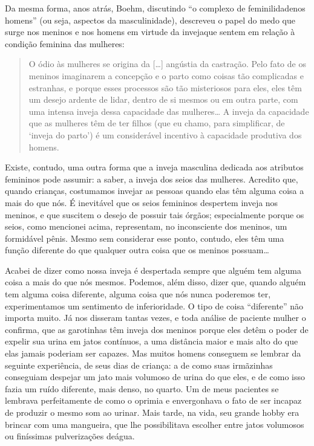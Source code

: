 Da mesma forma, anos atrás, Boehm,\idxboehm{} discutindo ``o
complexo de feminilidade\idxcompl[|(] nos homens'' (ou seja, aspectos
da masculinidade), descreveu o papel do medo que surge nos meninos e
nos homens em virtude da inveja\idxfemininve[|(] que sentem em relação à condição
feminina das mulheres:

\begin{quote}
O ódio às mulheres se origina da [\ldots{}] angústia da
castração.\idxcasta{} Pelo fato de os meninos imaginarem a concepção e o parto
como coisas tão complicadas e estranhas, e porque esses processos são
tão misteriosos para eles, eles têm um desejo ardente de lidar, dentro
de si mesmos ou em outra parte, com uma intensa inveja dessa capacidade
das mulheres\ldots{} A inveja da capacidade que as mulheres têm de ter
filhos (que eu chamo, para simplificar, de `inveja do
parto') é um considerável incentivo à capacidade
produtiva dos homens.
\end{quote}

Existe, contudo, uma outra forma que a inveja masculina dedicada aos
atributos femininos pode assumir: a saber, a inveja dos seios\idxseios{} das
mulheres. Acredito que, quando crianças, costumamos invejar as
pessoas quando elas têm alguma coisa a mais do que nós. É inevitável
que os seios femininos despertem inveja nos meninos, e que suscitem o
desejo de possuir tais órgãos; especialmente porque os seios, como
mencionei acima, representam, no inconsciente dos meninos, um
formidável pênis. Mesmo sem considerar esse ponto, contudo, eles têm
uma função diferente do que qualquer outra coisa que os meninos
possuam\ldots{}

Acabei de dizer como nossa inveja é despertada sempre que alguém tem
alguma coisa a mais do que nós mesmos. Podemos, além disso, dizer que,
quando alguém tem alguma coisa diferente, alguma coisa que nós nunca
poderemos ter, experimentamos um sentimento de inferioridade. O tipo
de coisa ``diferente'' não importa muito. Já
nos disseram tantas vezes, e toda análise de paciente mulher o
confirma, que as garotinhas têm inveja\idxinvej{} dos meninos porque eles detêm o
poder de expelir sua urina em jatos contínuos, a uma distância maior e
mais alto do que elas jamais poderiam ser capazes. Mas muitos homens
conseguem se lembrar da seguinte experiência, de seus dias de criança:
a de como suas irmãzinhas conseguiam despejar um jato mais volumoso de
urina do que eles, e de como isso fazia um ruído diferente, mais denso,
no quarto. Um de meus pacientes se lembrava perfeitamente de como o
oprimia e envergonhava o fato de ser incapaz de produzir o mesmo som ao
urinar. Mais tarde, na vida, seu grande hobby era brincar com uma
mangueira, que lhe possibilitava escolher entre jatos volumosos ou
finíssimas pulverizações de\idxfemininve[|)] água.


